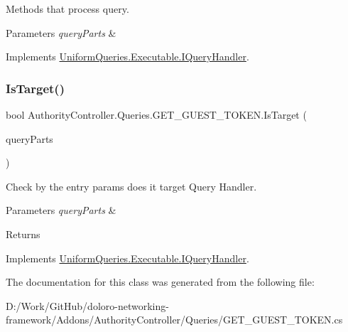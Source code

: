 Methods that process query. 


\begin{DoxyParams}{Parameters}
{\em query\+Parts} & \\
\hline
\end{DoxyParams}


Implements \mbox{\hyperlink{interface_uniform_queries_1_1_executable_1_1_i_query_handler_a3268d72c0388f5e3debba4d73bdfe523}{Uniform\+Queries.\+Executable.\+I\+Query\+Handler}}.

\mbox{\label{class_authority_controller_1_1_queries_1_1_g_e_t___g_u_e_s_t___t_o_k_e_n_a5606c5797e0a684a6bfbbd851f186268}} 
\subsubsection{\texorpdfstring{Is\+Target()}{IsTarget()}}
{\footnotesize\ttfamily bool Authority\+Controller.\+Queries.\+G\+E\+T\+\_\+\+G\+U\+E\+S\+T\+\_\+\+T\+O\+K\+E\+N.\+Is\+Target (\begin{DoxyParamCaption}\item[{\mbox{\hyperlink{struct_uniform_queries_1_1_query_part}{Query\+Part}} \mbox{[}$\,$\mbox{]}}]{query\+Parts }\end{DoxyParamCaption})}



Check by the entry params does it target Query Handler. 


\begin{DoxyParams}{Parameters}
{\em query\+Parts} & \\
\hline
\end{DoxyParams}
\begin{DoxyReturn}{Returns}

\end{DoxyReturn}


Implements \mbox{\hyperlink{interface_uniform_queries_1_1_executable_1_1_i_query_handler_a0f43184bf3e306a7cbebc39098f044ee}{Uniform\+Queries.\+Executable.\+I\+Query\+Handler}}.



The documentation for this class was generated from the following file\+:\begin{DoxyCompactItemize}
\item 
D\+:/\+Work/\+Git\+Hub/doloro-\/networking-\/framework/\+Addons/\+Authority\+Controller/\+Queries/G\+E\+T\+\_\+\+G\+U\+E\+S\+T\+\_\+\+T\+O\+K\+E\+N.\+cs\end{DoxyCompactItemize}
